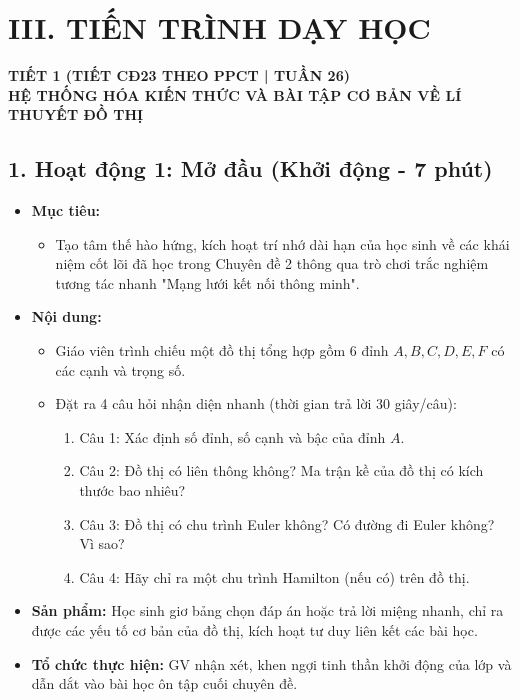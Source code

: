 \documentclass[12pt, a4paper]{article}
\begin{document}
\section*{III. TIẾN TRÌNH DẠY HỌC}

\begin{center}
    \textbf{\large TIẾT 1 (TIẾT CĐ23 THEO PPCT | TUẦN 26)}\\[4pt]
    \textbf{\large HỆ THỐNG HÓA KIẾN THỨC VÀ BÀI TẬP CƠ BẢN VỀ LÍ THUYẾT ĐỒ THỊ}
\end{center}

\subsection*{1. Hoạt động 1: Mở đầu (Khởi động - 7 phút)}

\begin{itemize}[leftmargin=1.2cm]
    \item[a)] \textbf{Mục tiêu:}
    \begin{itemize}[leftmargin=0.6cm]
        \item Tạo tâm thế hào hứng, kích hoạt trí nhớ dài hạn của học sinh về các khái niệm cốt lõi đã học trong Chuyên đề 2 thông qua trò chơi trắc nghiệm tương tác nhanh "Mạng lưới kết nối thông minh".
    \end{itemize}

    \item[b)] \textbf{Nội dung:}
    \begin{itemize}[leftmargin=0.6cm]
        \item Giáo viên trình chiếu một đồ thị tổng hợp gồm 6 đỉnh $A, B, C, D, E, F$ có các cạnh và trọng số.
        \item Đặt ra 4 câu hỏi nhận diện nhanh (thời gian trả lời 30 giây/câu):
        \begin{enumerate}[leftmargin=0.6cm]
            \item Câu 1: Xác định số đỉnh, số cạnh và bậc của đỉnh $A$.
            \item Câu 2: Đồ thị có liên thông không? Ma trận kề của đồ thị có kích thước bao nhiêu?
            \item Câu 3: Đồ thị có chu trình Euler không? Có đường đi Euler không? Vì sao?
            \item Câu 4: Hãy chỉ ra một chu trình Hamilton (nếu có) trên đồ thị.
        \end{enumerate}
    \end{itemize}

    \item[c)] \textbf{Sản phẩm:} Học sinh giơ bảng chọn đáp án hoặc trả lời miệng nhanh, chỉ ra được các yếu tố cơ bản của đồ thị, kích hoạt tư duy liên kết các bài học.
    \item[d)] \textbf{Tổ chức thực hiện:} GV nhận xét, khen ngợi tinh thần khởi động của lớp và dẫn dắt vào bài học ôn tập cuối chuyên đề.
\end{itemize}
\end{document}
